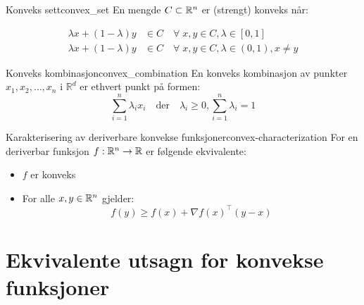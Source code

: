 \begin{definition}{Konveks sett}{convex_set}
	En mengde \(C \subset \mathbb{R}^n\) er (strengt) konveks når:

	\begin{align*}
		\lambda x + (1 - \lambda)y & \in C \quad \forall \; x, y \in C, \lambda \in [0, 1] \tag{Konveks}                   \\
		\lambda x + (1 - \lambda)y & \in C \quad \forall \; x, y \in C, \lambda \in (0, 1), x \neq y \tag{Strengt konveks}
	\end{align*}

\end{definition}

\begin{definition}{Konveks kombinasjon}{convex_combination}
	En konveks kombinasjon av punkter $x_1, x_2, \ldots, x_n$ i $\mathbb{R}^d$ er ethvert punkt på formen:
	\[
		\sum_{i=1}^n \lambda_i x_i \quad \text{der} \quad \lambda_i \geq 0, \sum_{i=1}^n \lambda_i = 1
	\]
\end{definition}

\begin{remark}{Karakterisering av deriverbare konvekse funksjoner}{convex-characterization}
	For en deriverbar funksjon  \(f: \mathbb{R}^n \to \mathbb{R}\) er følgende ekvivalente:
	\begin{itemize}
		\item  \(f\) er konveks
		\item For alle  \(x, y \in \mathbb{R}^n\) gjelder:
		      \[
			      f(y) \geq f(x) + \nabla f(x)^\top (y - x)
		      \]
	\end{itemize}
\end{remark}

\section{Ekvivalente utsagn for konvekse funksjoner}

